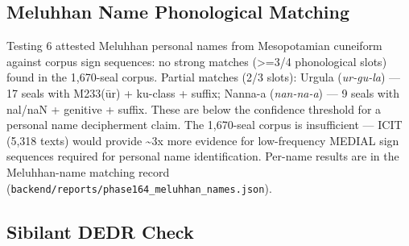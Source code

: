 \documentclass[11pt]{article}
\begin{document}
\subsection{Meluhhan Name Phonological Matching
}\label{meluhhan-name-phonological-matching-phase-164}

Testing 6 attested Meluhhan personal names from Mesopotamian cuneiform
against corpus sign sequences: no strong matches (\textgreater{}=3/4 phonological
slots) found in the 1,670-seal corpus. Partial matches (2/3 slots):
Urgula (\emph{ur-gu-la}) --- 17 seals with M233(ūr) + ku-class + suffix;
Nanna-a (\emph{nan-na-a}) --- 9 seals with nal/naN + genitive + suffix.
These are below the confidence threshold for a personal name
decipherment claim. The 1,670-seal corpus is insufficient --- ICIT (5,318 texts) would provide \textasciitilde3x more evidence for low-frequency MEDIAL sign sequences required for personal name identification. Per-name results are in the Meluhhan-name matching record (\texttt{backend/reports/phase164\_meluhhan\_names.json}).

\subsection{Sibilant DEDR Check}\label{sibilant-dedr-cross-validation-phase-166}
\end{document}

